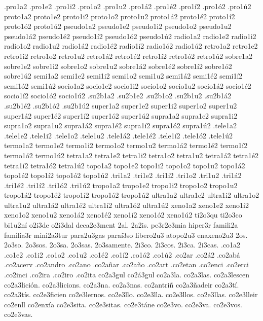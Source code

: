 {.pro1a2 .pro1e2 .pro1i2 .pro1o2 .pro1u2 .pro1á2 .pro1é2 .pro1í2 .pro1ó2 .pro1ú2 
proto1a2 proto1e2 proto1i2 proto1o2 proto1u2 proto1á2 proto1é2 proto1í2 proto1ó2 proto1ú2 
pseudo1a2 pseudo1e2 pseudo1i2 pseudo1o2 pseudo1u2 pseudo1á2 pseudo1é2 pseudo1í2 pseudo1ó2 pseudo1ú2 
radio1a2 radio1e2 radio1i2 radio1o2 radio1u2 radio1á2 radio1é2 radio1í2 radio1ó2 radio1ú2 
retro1a2 retro1e2 retro1i2 retro1o2 retro1u2 retro1á2 retro1é2 retro1í2 retro1ó2 retro1ú2 
sobre1a2 sobre1e2 sobre1i2 sobre1o2 sobre1u2 sobre1á2 sobre1é2 sobre1í2 sobre1ó2 sobre1ú2 
semi1a2 semi1e2 semi1i2 semi1o2 semi1u2 semi1á2 semi1é2 semi1í2 semi1ó2 semi1ú2 
socio1a2 socio1e2 socio1i2 socio1o2 socio1u2 socio1á2 socio1é2 socio1í2 socio1ó2 socio1ú2 
.su2b1a2 .su2b1e2          .su2b1o2 .su2b1u2 .su2b1á2 .su2b1é2           .su2b1ó2 .su2b1ú2 
super1a2 super1e2 super1i2 super1o2 super1u2 super1á2 super1é2 super1í2 super1ó2 super1ú2 
supra1a2 supra1e2 supra1i2 supra1o2 supra1u2 supra1á2 supra1é2 supra1í2 supra1ó2 supra1ú2 
.tele1a2 .tele1e2 .tele1i2 .tele1o2 .tele1u2 .tele1á2 .tele1é2 .tele1í2 .tele1ó2 .tele1ú2 
termo1a2 termo1e2 termo1i2 termo1o2 termo1u2 termo1á2 termo1é2 termo1í2 termo1ó2 termo1ú2 
tetra1a2 tetra1e2 tetra1i2 tetra1o2 tetra1u2 tetra1á2 tetra1é2 tetra1í2 tetra1ó2 tetra1ú2 
topo1a2 topo1e2 topo1i2 topo1o2 topo1u2 topo1á2 topo1é2 topo1í2 topo1ó2 topo1ú2 
.tri1a2 .tri1e2 .tri1i2 .tri1o2 .tri1u2 .tri1á2 .tri1é2 .tri1í2 .tri1ó2 .tri1ú2 
tropo1a2 tropo1e2 tropo1i2 tropo1o2 tropo1u2 tropo1á2 tropo1é2 tropo1í2 tropo1ó2 tropo1ú2 
ultra1a2 ultra1e2 ultra1i2 ultra1o2 ultra1u2 ultra1á2 ultra1é2 ultra1í2 ultra1ó2 ultra1ú2 
xeno1a2 xeno1e2 xeno1i2 xeno1o2 xeno1u2 xeno1á2 xeno1é2 xeno1í2 xeno1ó2 xeno1ú2 
%
ti2o3qu ti2o3co bi1u2ní o2i3de o2i3dal deca2e3ment 2al. 2a2is. pe3r2e3mia hiper3r 
famili2a familia3r mini2a3tur para2u3gas paraí3so 
%
libero2u3 
atopo2u3 
enaxeno2u3 
%
2os. 2o3so. 2o3sos. 2o3sa. 2o3sas. 2o3samente. 
2i3co. 2i3cos. 2i3ca. 2i3cas. 
%
.co1a2 .co1e2 .co1i2 .co1o2 .co1u2         .co1é2 .co1í2 .co1ó2 .co1ú2 
%
.co2ar 
.co2á2 
.co2abá 
.co2acerv 
.co2andro 
.co2ano 
.co2añar 
.co2año 
.co2art 
.co2etan 
.co2enci 
.co2erci 
.co2inci 
.co2ira 
.co2iro 
.co2ita 
%
co2a3gul 
co2á3gul 
co2a3la. 
co2a3las. 
co2a3lescen 
co2a3lición. 
co2a3licions. 
co2a3na. 
co2a3nas. 
co2antriñ 
co2a3ñadeir 
co2a3tí. 
co2a3tís. 
co2e3ficien 
co2e3lernos. 
co2e3llo. 
co2e3lla. 
co2e3llos. 
co2e3llas. 
co2e3lleir 
co2enll 
co2enxía 
co2e3sita. 
co2e3sitas. 
co2e3táne 
co2e3vo. 
co2e3va. 
co2e3vos. 
co2e3vas. 
}
